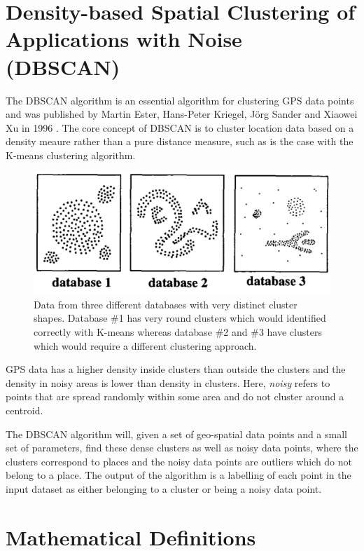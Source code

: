 \section{Density-based Spatial Clustering of Applications with Noise (DBSCAN)}
The DBSCAN algorithm is an essential algorithm for clustering GPS data points and was published by Martin Ester, Hans-Peter Kriegel, Jörg Sander and Xiaowei Xu in 1996 \cite{density-based-1996}. The core concept of DBSCAN is to cluster location data based on a density meaure rather than a pure distance measure, such as is the case with the K-means clustering algorithm. 

\begin{figure}
    \centering
    \includegraphics[width=\textwidth]{images/dbscan-clusters.png}
    \caption{Data from three different databases with very distinct cluster shapes. Database \#1 has very round clusters which would identified correctly with K-means whereas database \#2 and \#3 have clusters which would require a different clustering approach.}
    \label{fig:my_label}
\end{figure}

GPS data has a higher density inside clusters than outside the clusters and the density in noisy areas is lower than density in clusters. Here, \textit{noisy} refers to points that are spread randomly within some area and do not cluster around a centroid.

The DBSCAN algorithm will, given a set of geo-spatial data points and a small set of parameters, find these dense clusters as well as noisy data points, where the clusters correspond to places and the noisy data points are outliers which do not belong to a place. The output of the algorithm is a labelling of each point in the input dataset as either belonging to a cluster or being a noisy data point.

\section{Mathematical Definitions}

